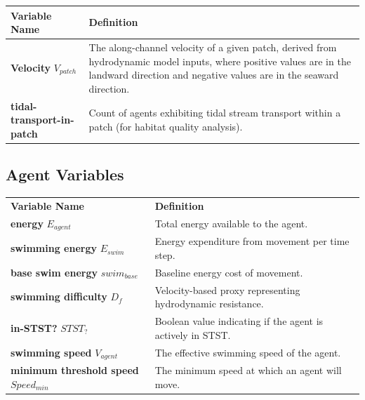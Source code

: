 \documentclass[
]{book}
\begin{document}
\begin{longtable}[]{@{}
  >{\centering\arraybackslash}p{}
  >{\centering\arraybackslash}p{}@{}}
\toprule\noalign{}
\begin{minipage}[b]{\linewidth}\centering
Variable Name
\end{minipage} & \begin{minipage}[b]{\linewidth}\centering
Definition
\end{minipage} \\
\midrule\noalign{}
\endhead
\bottomrule\noalign{}
\endlastfoot
\textbf{Velocity} \(V_{patch}\) & The along-channel velocity of a given patch, derived from hydrodynamic model inputs, where positive values are in the landward direction and negative values are in the seaward direction. \\
\textbf{tidal-transport-in-patch} & Count of agents exhibiting tidal stream transport within a patch (for habitat quality analysis). \\
\end{longtable}

\subsection{Agent Variables}\label{agent-variables-10}

\begin{longtable}[]{@{}
  >{\centering\arraybackslash}p{}
  >{\centering\arraybackslash}p{}@{}}
\toprule\noalign{}
\endhead
\bottomrule\noalign{}
\endlastfoot
\textbf{Variable Name} & \textbf{Definition} \\
\textbf{energy} \(E_{agent}\) & Total energy available to the agent. \\
\textbf{swimming energy} \(E_{swim}\) & Energy expenditure from movement per time step. \\
\textbf{base swim energy} \(swim_{base}\) & Baseline energy cost of movement. \\
\textbf{swimming difficulty} \(D_f\) & Velocity-based proxy representing hydrodynamic resistance. \\
\textbf{in-STST?} \(STST_{?}\) & Boolean value indicating if the agent is actively in STST. \\
\textbf{swimming speed} \(V_{agent}\) & The effective swimming speed of the agent. \\
\textbf{minimum threshold speed} \(Speed_{min}\) & The minimum speed at which an agent will move. \\
\end{longtable}
\end{document}
